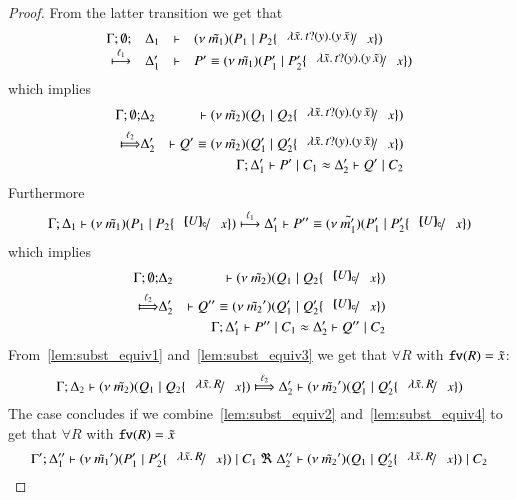 \begin{proof}
	\noi From the latter transition we get that
%
\[
		\mhorel{\Gamma}{\Delta_1}{\newsp{\tilde{m_1}}{P_1 \Par P_2 \subst{\abs{\tilde{x}}{\binp{t}{y} (\appl{y}{\tilde{x}})}}{x}}}
		{\hby{\ell_1}}{\Delta_1'}{P' \scong}{\newsp{\tilde{m_1}}{P_1' \Par P_2' \subst{\abs{\tilde{x}}{\binp{t}{y} (\appl{y}{\tilde{x}})}}{x}}}
\]
%
	\noi which implies
%
	\begin{eqnarray}
		\Gamma; \es; &\Delta_2& \proves \newsp{\tilde{m_2}}{Q_1 \Par Q_2 \subst{\abs{\tilde{x}}{\binp{t}{y} (\appl{y}{\tilde{x}})}}{x}} \nonumber \\
		\Hby{\ell_2}&
		\Delta_2'& \proves Q' \scong \newsp{\tilde{m_2}}{Q_1' \Par Q_2' \subst{\abs{\tilde{x}}{\binp{t}{y} (\appl{y}{\tilde{x}})}}{x}}
		\label{lem:subst_equiv1}
		\\
		&&\horel{\Gamma}{\Delta_1'}{P' \Par C_1}{\wb}{\Delta_2'}{Q' \Par C_2} \label{lem:subst_equiv2}
	\end{eqnarray}
%
	\noi Furthermore
%
\[
	\horel{\Gamma}{\Delta_1}{\newsp{\tilde{m_1}}{P_1 \Par P_2 \subst{\omapchar{U}}{x}}}{\hby{\ell_1}}
	{\Delta_1'}{P'' \scong \newsp{\tilde{m_1'}}{P_1' \Par P_2' \subst{\omapchar{U}}{x}}}
\]
%
	\noi which implies
%
	\begin{eqnarray}
		\Gamma; \es; &\Delta_2& \proves \newsp{\tilde{m_2}}{Q_1 \Par Q_2 \subst{\omapchar{U}}{x}} \nonumber \\
		\Hby{\ell_2} &\Delta_2'& \proves  Q'' \scong \newsp{\tilde{m_2}'}{Q_1' \Par Q_2' \subst{\omapchar{U}}{x}}
		\label{lem:subst_equiv3}
		\\
		&&\horel{\Gamma}{\Delta_1'}{P'' \Par C_1}{\wb}{\Delta_2'}{Q'' \Par C_2} \label{lem:subst_equiv4}
	\end{eqnarray}
%
	\noi From~\ref{lem:subst_equiv1} and~\ref{lem:subst_equiv3} we get that $\forall R$ with $\mathtt{fv}(R) = \tilde{x}$:
%
	\[
		\horel{\Gamma}{\Delta_2}{\newsp{\tilde{m_2}}{Q_1 \Par Q_2 \subst{\abs{\tilde{x}}{R}}{x}}}
		{\Hby{\ell_2}}
		{\Delta_2'}{\newsp{\tilde{m_2}'}{Q_1' \Par Q_2' \subst{\abs{\tilde{x}}{R}}{x}}}
	\]
%
	\noi The case concludes if we combine~\ref{lem:subst_equiv2} and~\ref{lem:subst_equiv4} to get that $\forall R$ with $\mathtt{fv}(R) = \tilde{x}$
%
	\[
		\horel{\Gamma'}{\Delta_1''}{\newsp{\tilde{m_1}'}{P_1' \Par P_2' \subst{\abs{\tilde{x}}{R}}{x}} \Par C_1}
		{\ \Re\ }
		{\Delta_2''}{\newsp{\tilde{m_2}'}{Q_1 \Par Q_2' \subst{\abs{\tilde{x}}{R}}{x}} \Par C_2}
	\]

	\newcommand{\auxtr}[1]{\abs{\tilde{x}}{\binp{#1}{y} (\appl{y}{\tilde{x}})}}


\end{proof}
